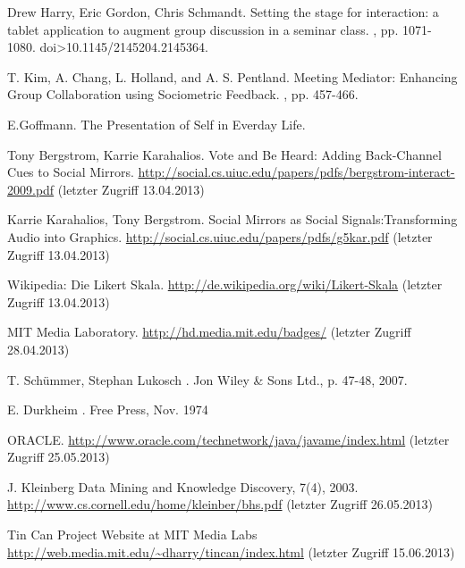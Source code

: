 \documentclass{seminarvorlage}
\begin{document}
\begin{thebibliography}{[9]}

Drew Harry, Eric Gordon, Chris Schmandt.
\newblock Setting the stage for interaction: a tablet application to augment group discussion in a seminar class. 
, pp. 1071-1080. doi>10.1145/2145204.2145364. 


T. Kim, A. Chang, L. Holland, and A. S. Pentland.
\newblock Meeting Mediator: Enhancing Group Collaboration using Sociometric Feedback. 
, pp. 457-466.

E.Goffmann.
\newblock The Presentation of Self in Everday Life.

Tony Bergstrom, Karrie Karahalios. 
\newblock Vote and Be Heard: Adding Back-Channel Cues to Social Mirrors.
 \url {http://social.cs.uiuc.edu/papers/pdfs/bergstrom-interact-2009.pdf} (letzter Zugriff 13.04.2013)

Karrie Karahalios, Tony Bergstrom. 
\newblock Social Mirrors as Social Signals:Transforming Audio into Graphics.
 \url {http://social.cs.uiuc.edu/papers/pdfs/g5kar.pdf} (letzter Zugriff 13.04.2013)

Wikipedia: Die Likert Skala.
\newblock \url {http://de.wikipedia.org/wiki/Likert-Skala} (letzter Zugriff 13.04.2013)

 MIT Media Laboratory. 
\newblock \url {http://hd.media.mit.edu/badges/} (letzter Zugriff 28.04.2013)

T. Schümmer, Stephan Lukosch
. Jon Wiley \& Sons Ltd., p. 47-48, 2007.

E. Durkheim
. Free Press, Nov. 1974

 ORACLE. 
\newblock \url {http://www.oracle.com/technetwork/java/javame/index.html}
(letzter Zugriff 25.05.2013)

J. Kleinberg Data Mining and Knowledge Discovery, 7(4),
2003.
\newblock \url {http://www.cs.cornell.edu/home/kleinber/bhs.pdf} (letzter Zugriff 26.05.2013)


Tin Can Project Website at MIT Media Labs
\newblock \url {http://web.media.mit.edu/~dharry/tincan/index.html} (letzter Zugriff 15.06.2013)


\end{thebibliography}
\end{document}
